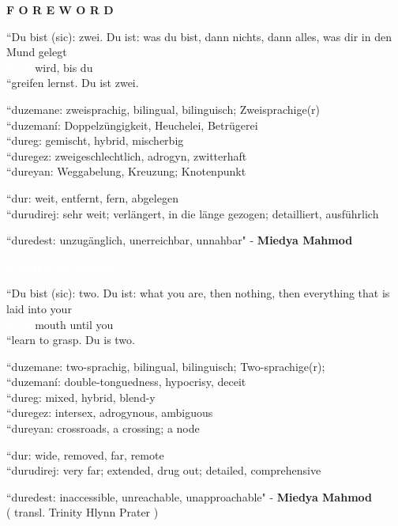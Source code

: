 \documentclass[10pt]{article}
\begin{document}
\begingroup
\huge \textbf{ F O R E W O R D }
\endgroup

\vspace{6\baselineskip}

\begingroup
``Du bist (sic): zwei. Du ist: was du bist, dann nichts, dann alles, was dir in den Mund gelegt \\
\textcolor{white}{XXX} wird, bis du \\
``greifen lernst. Du ist zwei. \\
\endgroup

\begingroup
``duzemane: zweisprachig, bilingual, bilinguisch; Zweisprachige(r) \\
``duzemaní: Doppelzüngigkeit, Heuchelei, Betrügerei \\
``dureg: gemischt, hybrid, mischerbig \\
``duregez: zweigeschlechtlich, adrogyn, zwitterhaft \\
``dureyan: Weggabelung, Kreuzung; Knotenpunkt \\
\endgroup

\begingroup
``dur: weit, entfernt, fern, abgelegen \\
``durudirej: sehr weit; verlängert, in die länge gezogen; detailliert, ausführlich \\
\endgroup

\begingroup
``duredest: unzugänglich, unerreichbar, unnahbar"
\phantom{text} \hfill - \textbf{Miedya Mahmod}
\endgroup

\pagebreak

\begingroup
\huge \textcolor{white}{\textbf{ F O R E W O R D }}
\endgroup

\vspace{6\baselineskip}

\begingroup
``Du bist (sic): two. Du ist: what you are, then nothing, then everything that is laid into your \\
\textcolor{white}{XXX} mouth until you \\
``learn to grasp. Du is two. \\
\endgroup

\begingroup
``duzemane: two-sprachig, bilingual, bilinguisch; Two-sprachige(r);  \\ 
``duzemaní: double-tonguedness, hypocrisy, deceit \\
``dureg: mixed, hybrid, blend-y \\
``duregez: intersex, adrogynous, ambiguous \\
``dureyan: crossroads, a crossing; a node \\
\endgroup

\begingroup
``dur: wide, removed, far, remote \\
``durudirej: very far; extended, drug out; detailed, comprehensive \\
\endgroup

\begingroup
``duredest: inaccessible, unreachable, unapproachable"
\phantom{text} \hfill - \textbf{Miedya Mahmod} \\
\phantom{text} \hfill ( transl. Trinity Hlynn Prater )
\endgroup
\end{document}
